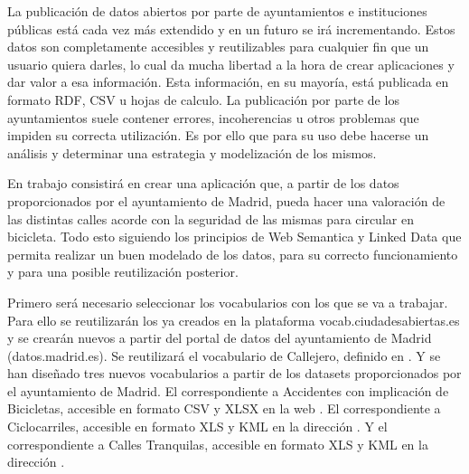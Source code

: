 La publicación de datos abiertos por parte de ayuntamientos e instituciones públicas está cada vez más extendido y en un futuro se irá incrementando. Estos datos son completamente accesibles y reutilizables para cualquier fin que un usuario quiera darles, lo cual da mucha libertad a la hora de crear aplicaciones y dar valor a esa información.
Esta información, en su mayoría, está publicada en formato RDF, CSV u hojas de calculo. La publicación por parte de los ayuntamientos suele contener errores, incoherencias u otros problemas que impiden su correcta utilización. Es por ello que para su uso debe hacerse un análisis y determinar una estrategia y modelización de los mismos.
\newline

En trabajo consistirá en crear una aplicación que, a partir de los datos proporcionados por el ayuntamiento de Madrid, pueda hacer una valoración de las distintas calles acorde con la seguridad de las mismas para circular en bicicleta. Todo esto siguiendo los principios de Web Semantica y Linked Data que permita realizar un buen modelado de los datos, para su correcto funcionamiento y para una posible reutilización posterior.
\newline

Primero será necesario seleccionar los vocabularios con los que se va a trabajar. Para ello se reutilizarán los ya creados en la plataforma vocab.ciudadesabiertas.es y se crearán nuevos a partir del portal de datos del ayuntamiento de Madrid (datos.madrid.es). Se reutilizará el vocabulario de Callejero, definido en \cite{ciudadesbiertas_callejero}. Y se han diseñado tres nuevos vocabularios a partir de los datasets proporcionados por el ayuntamiento de Madrid. El correspondiente a Accidentes con implicación de Bicicletas, accesible en formato CSV y XLSX en la web \cite{datosMadrid_accidentesDeBicicleta}. El correspondiente a Ciclocarriles, accesible en formato XLS y KML en la dirección 
\cite{datosMadrid_ciclocarriles}. Y el correspondiente a Calles Tranquilas, accesible en formato XLS y KML en la dirección \cite{datosMadrid_callesTranquilas}.
\newline

